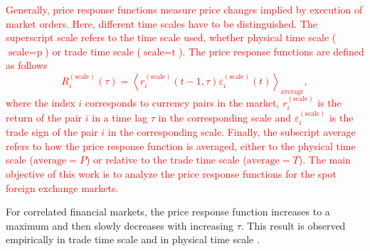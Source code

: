 \textcolor{red}{Generally, price response functions measure price changes implied by execution
of market orders. Here, different time scales have to be distinguished. The
superscript scale refers to the time scale used, whether physical time scale
($\textrm{scale} = \textrm{p}$) or trade time scale
($\textrm{scale} = \textrm{t}$). The price response functions are defined as
follows
\begin{equation}\label{eq:response_general}
    R^{\left(\textrm{scale}\right)}_{i}\left(\tau\right)=\left\langle
    r^{\left(\textrm{scale}\right)}_{i}\left(t-1, \tau\right)
    \varepsilon^{\left(\textrm{scale}\right)}_{i} \left(t\right)\right\rangle
    _{\textrm{average}},
\end{equation}
where the index $i$ corresponds to currency pairs in the market,
$r^{\left(\textrm{scale}\right)}_{i}$ is the return of the pair $i$ in a time
lag $\tau$ in the corresponding scale and
$\varepsilon^{\left(\textrm{scale}\right)}_{i}$ is the trade sign of the pair
$i$ in the corresponding scale.  Finally, the subscript average refers to how
the price response function is averaged, either to the physical time scale
($\textrm{average} = P$) or relative to the trade time scale
($\textrm{average} = T$). The main objective of this work is to analyze the
price response functions for the spot foreign exchange markets.}

For correlated financial markets, the price response function increases to a
maximum and then slowly decreases with increasing $\tau$. This result is
observed empirically in trade time scale and in physical time scale
\cite{my_paper_response_financial,Wang_2016_avg}.